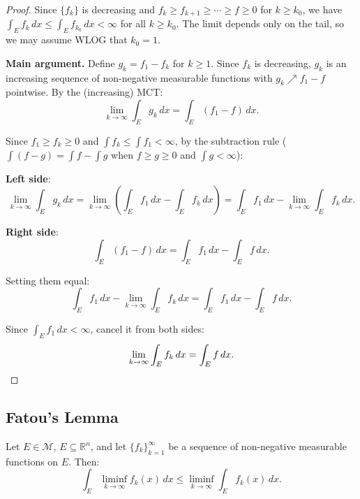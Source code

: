 \documentclass[11pt]{report}
\begin{document}
\begin{proof}
Since $\{f_k\}$ is decreasing and $f_k \geq f_{k+1} \geq \cdots \geq f \geq 0$ for $k \geq k_0$, we have $\int_E f_k\,dx \leq \int_E f_{k_0}\,dx < \infty$ for all $k \geq k_0$. The limit depends only on the tail, so we may assume WLOG that $k_0 = 1$.

\textbf{Main argument.} Define $g_k = f_1 - f_k$ for $k \geq 1$. Since $f_k$ is decreasing, $g_k$ is an increasing sequence of non-negative measurable functions with $g_k \nearrow f_1 - f$ pointwise. By the (increasing) MCT:
\[
\lim_{k \to \infty} \int_E g_k\,dx = \int_E (f_1 - f)\,dx.
\]

Since $f_1 \geq f_k \geq 0$ and $\int f_k \leq \int f_1 < \infty$, by the subtraction rule ($\int(f - g) = \int f - \int g$ when $f \geq g \geq 0$ and $\int g < \infty$):

\textbf{Left side}:
\[
\lim_{k \to \infty} \int_E g_k\,dx = \lim_{k \to \infty} \left(\int_E f_1\,dx - \int_E f_k\,dx\right) = \int_E f_1\,dx - \lim_{k \to \infty} \int_E f_k\,dx.
\]

\textbf{Right side}:
\[
\int_E (f_1 - f)\,dx = \int_E f_1\,dx - \int_E f\,dx.
\]

Setting them equal:
\[
\int_E f_1\,dx - \lim_{k \to \infty} \int_E f_k\,dx = \int_E f_1\,dx - \int_E f\,dx.
\]

Since $\int_E f_1\,dx < \infty$, cancel it from both sides:
\[
\lim_{k \to \infty} \int_E f_k\,dx = \int_E f\,dx. \qedhere
\]
\end{proof}

\subsection{Fatou's Lemma}

\begin{thmbox}
Let $E \in \mathcal{M}$, $E \subseteq \mathbb{R}^n$, and let $\{f_k\}_{k=1}^{\infty}$ be a sequence of non-negative measurable functions on $E$. Then:
\[
\int_E \liminf_{k \to \infty} f_k(x)\,dx \leq \liminf_{k \to \infty} \int_E f_k(x)\,dx.
\]
\end{thmbox}
\end{document}
